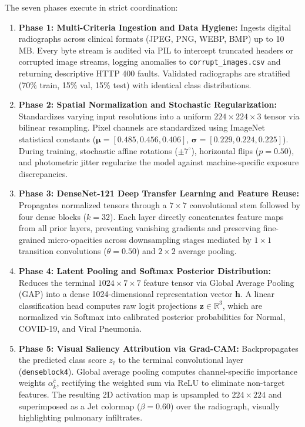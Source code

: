 \documentclass[12pt,a4paper]{report}
\begin{document}
The seven phases execute in strict coordination:
\begin{enumerate}
    \item \textbf{Phase 1: Multi-Criteria Ingestion and Data Hygiene:} Ingests digital radiographs across clinical formats (JPEG, PNG, WEBP, BMP) up to 10\,MB. Every byte stream is audited via PIL to intercept truncated headers or corrupted image streams, logging anomalies to \texttt{corrupt\_images.csv} and returning descriptive HTTP 400 faults. Validated radiographs are stratified (70\% train, 15\% val, 15\% test) with identical class distributions.
    \item \textbf{Phase 2: Spatial Normalization and Stochastic Regularization:} Standardizes varying input resolutions into a uniform $224 \times 224 \times 3$ tensor via bilinear resampling. Pixel channels are standardized using ImageNet statistical constants ($\boldsymbol{\mu} = [0.485, 0.456, 0.406]$, $\boldsymbol{\sigma} = [0.229, 0.224, 0.225]$). During training, stochastic affine rotations ($\pm 7^\circ$), horizontal flips ($p=0.50$), and photometric jitter regularize the model against machine-specific exposure discrepancies.
    \item \textbf{Phase 3: DenseNet-121 Deep Transfer Learning and Feature Reuse:} Propagates normalized tensors through a $7\times 7$ convolutional stem followed by four dense blocks ($k=32$). Each layer directly concatenates feature maps from all prior layers, preventing vanishing gradients and preserving fine-grained micro-opacities across downsampling stages mediated by $1\times 1$ transition convolutions ($\theta=0.50$) and $2\times 2$ average pooling.
    \item \textbf{Phase 4: Latent Pooling and Softmax Posterior Distribution:} Reduces the terminal $1024 \times 7 \times 7$ feature tensor via Global Average Pooling (GAP) into a dense 1024-dimensional representation vector $\mathbf{h}$. A linear classification head computes raw logit projections $\mathbf{z} \in \mathbb{R}^3$, which are normalized via Softmax into calibrated posterior probabilities for Normal, COVID-19, and Viral Pneumonia.
    \item \textbf{Phase 5: Visual Saliency Attribution via Grad-CAM:} Backpropagates the predicted class score $z_{\hat{c}}$ to the terminal convolutional layer (\texttt{denseblock4}). Global average pooling computes channel-specific importance weights $\alpha_k^{\hat{c}}$, rectifying the weighted sum via ReLU to eliminate non-target features. The resulting 2D activation map is upsampled to $224 \times 224$ and superimposed as a Jet colormap ($\beta=0.60$) over the radiograph, visually highlighting pulmonary infiltrates.

\end{enumerate}
\end{document}
